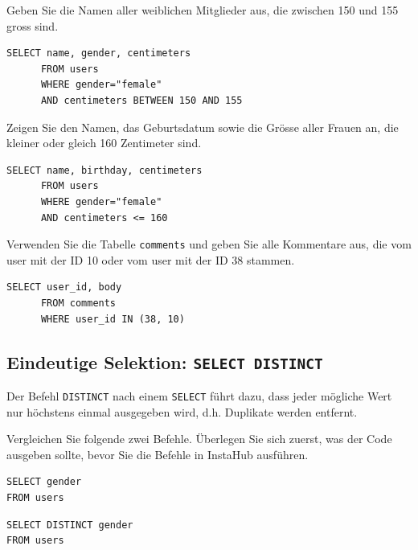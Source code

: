 \begin{myexercise}
  Geben Sie die Namen aller weiblichen Mitglieder aus, die zwischen 150 und 155 gross sind.
  \begin{myanswer}
    \begin{lstlisting}[style=sql]
      SELECT name, gender, centimeters
      FROM users
      WHERE gender="female"
      AND centimeters BETWEEN 150 AND 155
    \end{lstlisting}
  \end{myanswer}
\end{myexercise}
\begin{myexercise}
  Zeigen Sie den Namen, das Geburtsdatum sowie die Grösse aller Frauen an, die kleiner oder gleich 160 Zentimeter sind.
  \begin{myanswer}
    \begin{lstlisting}[style=sql]
      SELECT name, birthday, centimeters
      FROM users
      WHERE gender="female"
      AND centimeters <= 160
    \end{lstlisting}
  \end{myanswer}
\end{myexercise}

\begin{myexercise}
  Verwenden Sie die Tabelle \texttt{comments} und geben Sie alle Kommentare aus, die vom user mit der ID 10 oder vom user mit der ID 38 stammen.
  \begin{myanswer}
    \begin{lstlisting}[style=sql]
      SELECT user_id, body 
      FROM comments 
      WHERE user_id IN (38, 10)
\end{lstlisting}
  \end{myanswer}
\end{myexercise}


\subsection{Eindeutige Selektion: \texorpdfstring{\lstinline[style=sql]|SELECT DISTINCT|}{SELECT DISTINCT}}

Der Befehl \lstinline[style=sql]|DISTINCT| nach einem \lstinline[style=sql]|SELECT| führt dazu, dass jeder mögliche Wert
nur höchstens einmal ausgegeben wird, d.h. Duplikate werden entfernt.

\begin{myexercise}
  Vergleichen Sie folgende zwei Befehle. Überlegen Sie sich zuerst, was der Code ausgeben sollte, bevor Sie die Befehle in InstaHub ausführen.

 \begin{lstlisting}[style=sql]
SELECT gender
FROM users
\end{lstlisting}

  \begin{lstlisting}[style=sql]
SELECT DISTINCT gender
FROM users
\end{lstlisting}
\end{myexercise}

